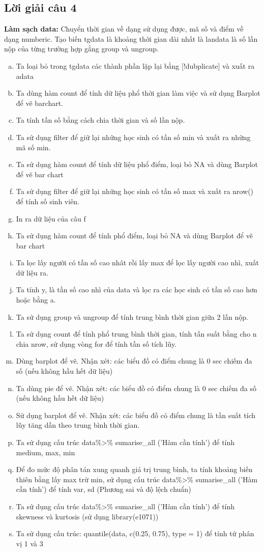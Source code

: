 \documentclass[a4paper]{article}
\theoremstyle{definition}
\begin{document}
\subsection{Lời giải câu 4}
\noindent \textbf{Làm sạch data:} Chuyển thời gian về dạng sử dụng được, mã số và điểm về dạng numberic. Tạo biến tgdata là khoảng thời gian dài nhất là landata là số lần nộp của từng trường hợp gằng group và ungroup. 
\begin{enumerate}[a)]
    \item Ta loại bỏ trong tgdata các thành phần lặp lại bằng [!dubplicate] và xuất ra adata
    \item Ta dùng hàm count để tính dữ liệu phổ thời gian làm việc và sử dụng Barplot để vẽ barchart. 
    \item Ta tính tần số bằng cách chia thời gian và số lần nộp. 
    \item Ta sử dụng filter để giữ lại những học sinh có tần số min và xuất ra những mã số min. 
    \item Ta sử dụng hàm count để tính dữ liệu phổ điểm, loại bỏ NA và dùng Barplot để vẽ bar chart
    \item Ta sử dụng filter để giữ lại những học sinh có tần số max và xuất ra nrow() để tính số sinh viên.
    \item In ra dữ liệu của câu f
    \item Ta sử dụng hàm count để tính phổ điểm, loại bỏ NA và dùng Barplot để vẽ bar chart
    \item Ta lọc lấy người có tần số cao nhât rồi lấy max để lọc lấy người cao nhì, xuất dữ liệu ra. 
    \item Ta tính y, là tần số cao nhì của data và lọc ra các học sinh có tần số cao hơn hoặc bằng a.
    \item Ta sử dụng group và ungroup để tính trung bình thời gian giữa 2 lần nộp.
    \item  Ta sử dụng count để tính phổ trung bình thời gian, tính tần suất bằng cho n chia nrow, sử dụng vòng for để tính tần số tích lũy. 
    \item Dùng barplot để vẽ. Nhận xét: các biểu đồ có điểm chung là 0 sec chiếm đa số (nếu không hầu hết dữ liệu) 
    \item Ta dùng pie để vẽ. Nhận xét: các biểu đồ có điểm chung là 0 sec chiếm đa số (nếu không hầu hết dữ liệu) 
    \item Sử dụng barplot để vẽ. Nhận xét: các biểu đồ có điểm chung là tần suất tích lũy tăng dần theo trung bình thời gian.
    \item Ta sử dụng cấu trúc data\%>\% sumarise\_all ('Hàm cần tính') để tính medium, max, min 
    \item Để đo mức độ phân tán xung quanh giá trị trung bình, ta tính khoảng biến thiên bằng lấy max trừ min, sử dụng cấu trúc data\%>\% sumarise\_all ('Hàm cần tính') để tính var, sd (Phương sai và độ lệch chuẩn)
    \item Ta sử dụng cấu trúc data\%>\% sumarise\_all ('Hàm cần tính') để tính skewness và kurtosis (sử dụng library(e1071))
    \item Ta sử dụng cấu trúc: quantile(data, c(0.25, 0.75), type = 1) để tính tứ phân vị 1 và 3 
\end{enumerate}
\end{document}
